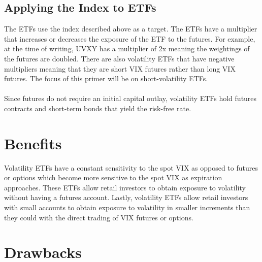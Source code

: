 \documentclass[11pt, oneside]{book}
\begin{document}
\subsection{Applying the Index to ETFs} \label{ETFs-Index-Applying}
The ETFs use the index described above as a target. The ETFs have a multiplier that increases or decreases the exposure of the ETF to the futures. For example, at the time of writing, UVXY has a multiplier of 2x meaning the weightings of the futures are doubled. There are also volatility ETFs that have negative multipliers meaning that they are short VIX futures rather than long VIX futures. The focus of this primer will be on short-volatility ETFs.\\
\\
Since futures do not require an initial capital outlay, volatility ETFs hold futures contracts and short-term bonds that yield the risk-free rate.

\section{Benefits} \label{ETFs-Benefits}
Volatility ETFs have a constant sensitivity to the spot VIX as opposed to futures or options which become more sensitive to the spot VIX as expiration approaches. These ETFs allow retail investors to obtain exposure to volatility without having a futures account. Lastly, volatility ETFs allow retail investors with small accounts to obtain exposure to volatility in smaller increments than they could with the direct trading of VIX futures or options.

\section{Drawbacks} \label{ETFs-Drawbacks}
\end{document}
